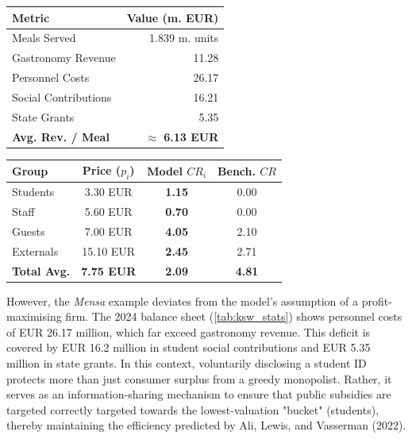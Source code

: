 \documentclass[12pt, a4paper]{article}
\begin{document}
\begin{table}[h]
    \centering
    \scriptsize
    
    \begin{minipage}{0.45\textwidth}
        \centering
        \label{tab:ksw_stats}
        \begin{tabular}{@{}lr@{}}
            \toprule
            \textbf{Metric} & \textbf{Value (m. EUR)} \\ \midrule
            Meals Served & 1.839 m. units \\
            Gastronomy Revenue & 11.28 \\
            Personnel Costs & 26.17 \\
            Social Contributions & 16.21 \\
            State Grants & 5.35 \\ \midrule
            \textbf{Avg. Rev. / Meal} & \textbf{$\approx$ 6.13 EUR} \\ \bottomrule
        \end{tabular}
    \end{minipage}
    \hfill 
    \begin{minipage}{0.52\textwidth}
        \centering
        \label{tab:pricing_structure}
        \begin{tabular}{@{}lccc@{}}
            \toprule
            \textbf{Group} & \textbf{Price} ($p_i$) & \textbf{Model} $CR_i$ & \textbf{Bench.} $CR$ \\ \midrule
            Students  & 3.30 EUR & \textbf{1.15} & 0.00 \\
            Staff     & 5.60 EUR & \textbf{0.70} & 0.00 \\
            Guests    & 7.00 EUR & \textbf{4.05} & 2.10 \\
            Externals & 15.10 EUR & \textbf{2.45} & 2.71 \\ \midrule
            \textbf{Total Avg.} & \textbf{7.75 EUR} & \textbf{2.09} & \textbf{4.81} \\ \bottomrule
        \end{tabular}
    \end{minipage}
    \vspace{0.5em}
\end{table}

However, the \textit{Mensa} example deviates from the model's assumption of a profit-maximising firm. The 2024 balance sheet (\cref{tab:ksw_stats}) shows personnel costs of EUR 26.17 million, which far exceed gastronomy revenue. This deficit is covered by EUR 16.2 million in student social contributions and EUR 5.35 million in state grants. In this context, voluntarily disclosing a student ID protects more than just consumer surplus from a greedy monopolist. Rather, it serves as an information-sharing mechanism to ensure that public subsidies are targeted correctly targeted towards the lowest-valuation "bucket" (students), thereby maintaining the efficiency predicted by Ali, Lewis, and Vasserman (2022).    
\end{document}
